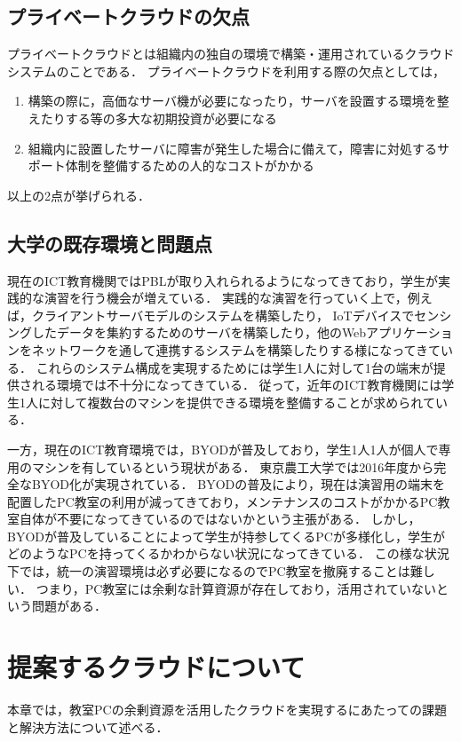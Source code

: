 \documentclass[11pt,a4paper]{jsarticle}
\begin{document}
\subsection{プライベートクラウドの欠点}
プライベートクラウドとは組織内の独自の環境で構築・運用されているクラウドシステムのことである．
プライベートクラウドを利用する際の欠点としては，
\begin{enumerate}
	\item 構築の際に，高価なサーバ機が必要になったり，サーバを設置する環境を整えたりする等の多大な初期投資が必要になる
	\item 組織内に設置したサーバに障害が発生した場合に備えて，障害に対処するサポート体制を整備するための人的なコストがかかる
\end{enumerate}
以上の2点が挙げられる．

\subsection{大学の既存環境と問題点}
現在のICT教育機関ではPBLが取り入れられるようになってきており，学生が実践的な演習を行う機会が増えている．
実践的な演習を行っていく上で，例えば，クライアントサーバモデルのシステムを構築したり，
IoTデバイスでセンシングしたデータを集約するためのサーバを構築したり，他のWebアプリケーションをネットワークを通して連携するシステムを構築したりする様になってきている．
これらのシステム構成を実現するためには学生1人に対して1台の端末が提供される環境では不十分になってきている．
従って，近年のICT教育機関には学生1人に対して複数台のマシンを提供できる環境を整備することが求められている．
\par 一方，現在のICT教育環境では，BYODが普及しており，学生1人1人が個人で専用のマシンを有しているという現状がある．
東京農工大学では2016年度から完全なBYOD化が実現されている\cite{nokodai}．
BYODの普及により，現在は演習用の端末を配置したPC教室の利用が減ってきており，メンテナンスのコストがかかるPC教室自体が不要になってきているのではないかという主張がある．
しかし，BYODが普及していることによって学生が持参してくるPCが多様化し，学生がどのようなPCを持ってくるかわからない状況になってきている．
この様な状況下では，統一の演習環境は必ず必要になるのでPC教室を撤廃することは難しい．
つまり，PC教室には余剰な計算資源が存在しており，活用されていないという問題がある．

\section{提案するクラウドについて}
本章では，教室PCの余剰資源を活用したクラウドを実現するにあたっての課題と解決方法について述べる．
\end{document}
